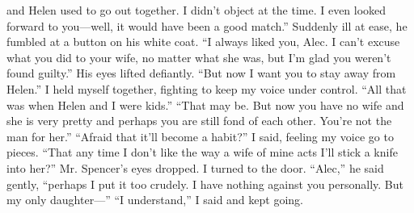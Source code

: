 \documentclass{novel}
\begin{document}
and Helen used to go out together. I didn’t object at the time. I even looked forward to you—well, it would have been a good match.” Suddenly ill at ease, he fumbled at a button on his white coat. “I always liked you, Alec. I can’t excuse what you did to your wife, no matter what she was, but I’m glad you weren’t found guilty.” His eyes lifted defiantly. “But now I want you to stay away from Helen.” I held myself together, fighting to keep my voice under control. “All that was when Helen and I were kids.” “That may be. But now you have no wife and she is very pretty and perhaps you are still fond of each other. You’re not the man for her.” “Afraid that it’ll become a habit?” I said, feeling my voice go to pieces. “That any time I don’t like the way a wife of mine acts I’ll stick a knife into her?” Mr. Spencer’s eyes dropped. I turned to the door. “Alec,” he said gently, “perhaps I put it too crudely. I have nothing against you personally. But my only daughter—” “I understand,” I said and kept going.


\begin{ChapterStart}

\vspace{3\nbs}
\end{ChapterStart}

\end{document}
